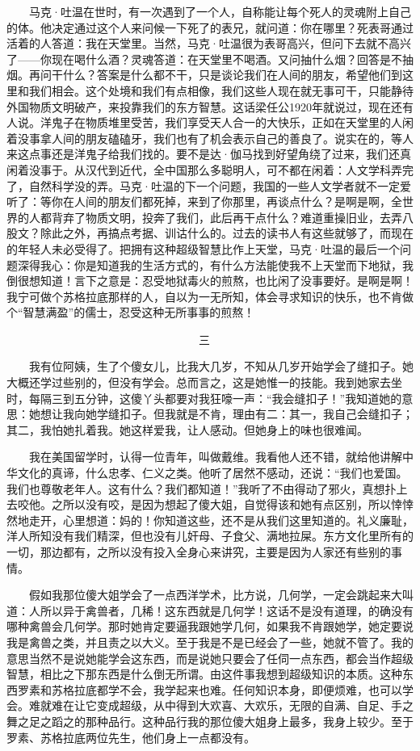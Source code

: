 　　马克·吐温在世时，有一次遇到了一个人，自称能让每个死人的灵魂附上自己的体。他决定通过这个人来问候一下死了的表兄，就问道：你在哪里？死表哥通过活着的人答道：我在天堂里。当然，马克·吐温很为表哥高兴，但问下去就不高兴了——你现在喝什么酒？灵魂答道：在天堂里不喝酒。又问抽什么烟？回答是不抽烟。再问干什么？答案是什么都不干，只是谈论我们在人间的朋友，希望他们到这里和我们相会。这个处境和我们有点相像，我们这些人现在就无事可干，只能静待外国物质文明破产，来投靠我们的东方智慧。这话梁任公1920年就说过，现在还有人说。洋鬼子在物质堆里受苦，我们享受天人合一的大快乐，正如在天堂里的人闲着没事拿人间的朋友磕磕牙，我们也有了机会表示自己的善良了。说实在的，等人来这点事还是洋鬼子给我们找的。要不是达·伽马找到好望角绕了过来，我们还真闲着没事于。从汉代到近代，全中国那么多聪明人，可不都在闲着：人文学科弄完了，自然科学没的弄。马克·吐温的下一个问题，我国的一些人文学者就不一定爱听了：等你在人间的朋友们都死掉，来到了你那里，再谈点什么？是啊是啊，全世界的人都背弃了物质文明，投奔了我们，此后再干点什么？难道重操旧业，去弄八股文？除此之外，再搞点考据、训诂什么的。过去的读书人有这些就够了，而现在的年轻人未必受得了。把拥有这种超级智慧比作上天堂，马克·吐温的最后一个问题深得我心：你是知道我的生活方式的，有什么方法能使我不上天堂而下地狱，我倒很想知道！言下之意是：忍受地狱毒火的煎熬，也比闲了没事要好。是啊是啊！我宁可做个苏格拉底那样的人，自以为一无所知，体会寻求知识的快乐，也不肯做个“智慧满盈”的儒士，忍受这种无所事事的煎熬！ 


　　　　　　　　　　　　　　　　　三 

　　我有位阿姨，生了个傻女儿，比我大几岁，不知从几岁开始学会了缝扣子。她大概还学过些别的，但没有学会。总而言之，这是她惟一的技能。我到她家去坐时，每隔三到五分钟，这傻丫头都要对我狂嚎一声：“我会缝扣子！”我知道她的意思：她想让我向她学缝扣子。但我就是不肯，理由有二：其一，我自己会缝扣子；其二，我怕她扎着我。她这样爱我，让人感动。但她身上的味也很难闻。 

　　我在美国留学时，认得一位青年，叫做戴维。我看他人还不错，就给他讲解中华文化的真谛，什么忠孝、仁义之类。他听了居然不感动，还说：“我们也爱国。我们也尊敬老年人。这有什么？我们都知道！”我听了不由得动了邪火，真想扑上去咬他。之所以没有咬，是因为想起了傻大姐，自觉得该和她有点区别，所以悻悻然地走开，心里想道：妈的！你知道这些，还不是从我们这里知道的。礼义廉耻，洋人所知没有我们精深，但也没有儿奸母、子食父、满地拉屎。东方文化里所有的一切，那边都有，之所以没有投入全身心来讲究，主要是因为人家还有些别的事情。 

　　假如我那位傻大姐学会了一点西洋学术，比方说，几何学，一定会跳起来大叫道：人所以异于禽兽者，几稀！这东西就是几何学！这话不是没有道理，的确没有哪种禽兽会几何学。那时她肯定要逼我跟她学几何，如果我不肯跟她学，她定要说我是禽兽之类，并且责之以大义。至于我是不是已经会了一些，她就不管了。我的意思当然不是说她能学会这东西，而是说她只要会了任伺一点东西，都会当作超级智慧，相比之下那东西是什么倒无所谓。由这件事我想到超级知识的本质。这种东西罗素和苏格拉底都学不会，我学起来也难。任何知识本身，即便烦难，也可以学会。难就难在让它变成超级，从中得到大欢喜、大欢乐，无限的自满、自足、手之舞之足之蹈之的那种品行。这种品行我的那位傻大姐身上最多，我身上较少。至于罗素、苏格拉底两位先生，他们身上一点都没有。 

